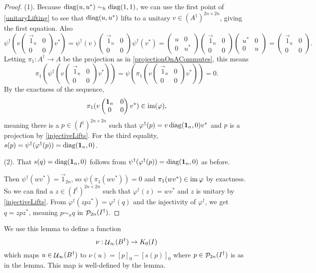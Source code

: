 \begin{proof}
(1). Because $\operatorname{diag}(u,u^*)\sim_h \operatorname{diag}(1,1)$, we can use the first point of \ref{unitaryLifting} to see that $\operatorname{diag}(u,u^*)$ lifts to a unitary $v\in (A^\dagger)^{2n\times 2n}$, giving the first equation. Also
\[ \psi^\dagger( v \begin{pmatrix}
\vec{1}_n & 0 \\ 0 & 0
\end{pmatrix}v^* ) = \psi^\dagger(v) \begin{pmatrix}
\vec{1}_n & 0 \\ 0 & 0
\end{pmatrix} \psi^\dagger(v^*) = \begin{pmatrix}
u & 0 \\ 0 & u^*
\end{pmatrix}\begin{pmatrix}
\vec{1}_n & 0 \\ 0 & 0
\end{pmatrix}\begin{pmatrix}
u^* & 0 \\ 0 & u
\end{pmatrix} = \begin{pmatrix}
\vec{1}_n & 0 \\ 0 & 0
\end{pmatrix}. \]
Letting $\pi_1: A^\dagger \to A$ be the projection as in \ref{projectionOnACommutes}, this means
\[ \pi_1(\psi^\dagger( v \begin{pmatrix}
\vec{1}_n & 0 \\ 0 & 0
\end{pmatrix}v^* )) = \psi(\pi_1( v \begin{pmatrix}
\vec{1}_n & 0 \\ 0 & 0
\end{pmatrix}v^* )) = 0. \]
By the exactness of the sequence, 
\[ \pi_1( v \begin{pmatrix}
\boldsymbol{\mathrm{1}}_n & 0 \\ 0 & 0
\end{pmatrix}v^* ) \in \operatorname{im} (\varphi), \]
meaning there is a $p\in (I^\dagger)^{2n\times 2n}$ such that $\varphi^\dagger(p) = v\operatorname{diag}(\boldsymbol{\mathrm{1}}_n,0)v^*$ and $p$ is a projection by \ref{injectiveLifts}.
For the third equality, $s(p) = \psi^\dagger(\varphi^\dagger(p)) = \operatorname{diag}(\boldsymbol{\mathrm{1}}_n, 0)$.

(2). That $s(q) = \operatorname{diag}(\boldsymbol{\mathrm{1}}_n, 0)$ follows from $\psi^\dagger(\varphi^\dagger(p)) = \operatorname{diag}(\boldsymbol{\mathrm{1}}_n, 0)$ as before.

Then $\psi^\dagger(wv^*) = \vec{1}_{2n}$, so $\psi(\pi_1(wv^*)) = 0$ and $\pi_1(wv^*)\in \operatorname{im}\varphi$ by exactness. So we can find a $z\in (I^\dagger)^{2n\times 2n}$ such that $\varphi^\dagger(z) = wv^*$ and $z$ is unitary by \ref{injectiveLifts}. From $\varphi^\dagger(zpz^*) = \varphi^\dagger(q)$ and the injectivity of $\varphi^\dagger$, we get $q = zpz^*$, meaning $p \sim_u q$ in $\mathop{\mathcal{P}}\nolimits_{2n}(I^\dagger)$.
\end{proof}
We use this lemma to define a function
\[ \nu: \mathop{\mathcal{U}}\nolimits_\infty(B^\dagger)\to K_0(I) \]
which maps $u\in\mathop{\mathcal{U}}\nolimits_\infty(B^\dagger)$ to $\nu(u) = [p]_0 - [s(p)]_0$ where $p\in\mathop{\mathcal{P}}\nolimits_{2n}(I^\dagger)$ is as in the lemma. This map is well-defined by the lemma.

